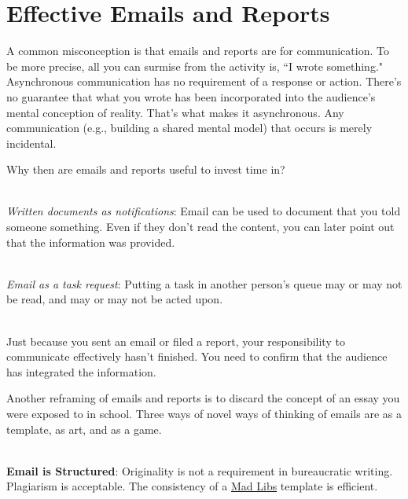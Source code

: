 \section{Effective Emails and Reports}


A common misconception is that emails and reports are for communication. To be more precise, all you can surmise from the activity is, ``I wrote something." 
Asynchronous communication has no requirement of a response or action. There's no guarantee that what you wrote has been incorporated into the audience's mental conception of reality. That's what makes it asynchronous. Any communication (e.g., building a shared mental model) that occurs is merely incidental.

Why then are emails and reports useful to invest time in?

\ \\
\textit{Written documents as notifications}: Email can be used to document that you told someone something. Even if they don't read the content, you can later point out that the information was provided.

\ \\
\textit{Email as a task request}: Putting a task in another person's queue may or may not be read, and may or may not be acted upon. 

\ \\
Just because you sent an email or filed a report, your responsibility to communicate effectively hasn't finished. You need to confirm that the audience has integrated the information. 




Another reframing of emails and reports is to discard the concept of an essay you were exposed to in school. Three ways of novel ways of thinking of emails are as a template, as art, and as a game.

\ \\
\textbf{Email is Structured}: Originality is not a requirement in bureaucratic writing. Plagiarism is acceptable. The consistency of a 
\href{https://en.wikipedia.org/wiki/Mad_Libs}{Mad Libs} 
template is efficient.  

